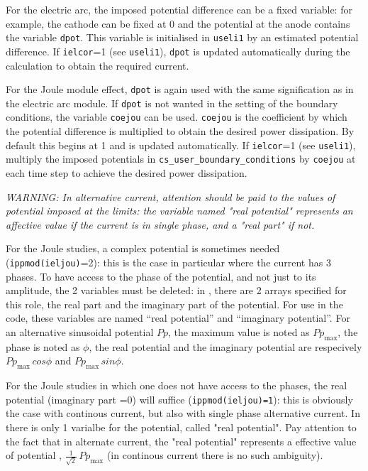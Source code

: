 {{\begin{list}{-}{}
\item For the electric arc, the imposed potential difference can be a fixed variable:
 for example, the cathode can be fixed at 0 and the potential at the anode
 contains the variable \texttt{dpot}. This variable is initialised in \texttt{useli1}
 by an estimated potential difference. If \texttt{ielcor}=1 (see
 \texttt{useli1}), \texttt{dpot} is updated automatically during the
 calculation to obtain the required current.
\item For the Joule module effect, \texttt{dpot} is again used with the same
 signification as in the electric arc module. If \texttt{dpot} is not wanted
 in the setting of the boundary conditions, the variable \texttt{coejou} can be
 used. \texttt{coejou} is the coefficient by which the potential difference is
 multiplied to obtain the desired power dissipation. By default this begins at
 1 and is updated automatically. If \texttt{ielcor}=1 (see \texttt
{useli1}), multiply the imposed potentials in
\texttt{cs\_user\_boundary\_conditions} by \texttt{coejou} at each time step to
achieve the desired power dissipation.
 \end{list}

 {\em WARNING: In alternative current, attention should be paid to the values of potential
 imposed at the limits: the variable named "real potential" represents an affective
 value if the current is in single phase, and a "real part" if not.}
\begin{list}{-}{}
\item For the Joule studies, a complex potential is sometimes needed
 (\texttt{ippmod(ieljou)}=2): this is the  case in particular where the current
 has 3 phases. To have access to the phase of the potential, and not just to its
 amplitude, the 2 variables must be deleted: in \CS, there are 2 arrays
 specified for this role, the real part and the imaginary
 part of the potential. For use in the code, these variables are named
 ``real potential'' and ``imaginary potential''. For an alternative
 sinusoidal potential $Pp$, the maximum value is noted as $Pp_\text{max}$,
 the phase is noted as $\phi$, the real potential
 and the imaginary potential are respecively $Pp_\text{max}\,cos\phi$ and
$Pp_\text{max}\,sin\phi$.
\item For the Joule studies in which one does not have access to the phases, the real
 potential (imaginary part =0) will suffice (\texttt{ippmod(ieljou)=1}): this is
 obviously the case with
 continous current, but also with single phase alternative current. In \CS
there is only 1 varialbe for the potential,  called "real potential". Pay attention to
 the fact that in alternate current, the "real potential" represents a effective value
 of potential , $\frac{1}{\sqrt{2}}\,Pp_\text{max}$ (in continous current there is no
 such ambiguity).
\end{list}

}}

